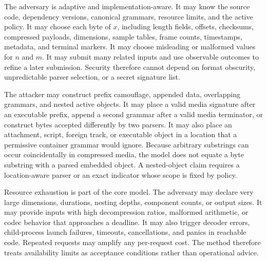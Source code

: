 The adversary is adaptive and implementation-aware. It may know the source
code, dependency versions, canonical grammars, resource limits, and the active
policy. It may choose each byte of $x$, including length fields,
offsets, checksums, compressed payloads, dimensions, sample tables, frame
counts, timestamps, metadata, and terminal markers. It may choose misleading or
malformed values for $n$ and $m$. It may submit many related inputs and use
observable outcomes to refine a later submission. Security therefore cannot
depend on format obscurity, unpredictable parser selection, or a secret
signature list.

The attacker may construct prefix camouflage, appended data, overlapping
grammars, and nested active objects. It may place a valid media signature after
an executable prefix, append a second grammar after a valid media terminator,
or construct bytes accepted differently by two parsers. It may also place an
attachment, script, foreign track, or executable object in a location that a
permissive container grammar would ignore. Because arbitrary substrings can
occur coincidentally in compressed media, the model does not equate a byte
substring with a parsed embedded object. A nested-object claim requires a
location-aware parser or an exact indicator whose scope is fixed by policy.

Resource exhaustion is part of the core model. The adversary may declare very
large dimensions, durations, nesting depths, component counts, or output sizes.
It may provide inputs with high decompression ratios, malformed arithmetic, or
codec behavior that approaches a deadline. It may also trigger decoder errors,
child-process launch failures, timeouts, cancellations, and panics in reachable
code. Repeated requests may amplify any per-request cost. The method therefore
treats availability limits as acceptance conditions rather than operational
advice.

